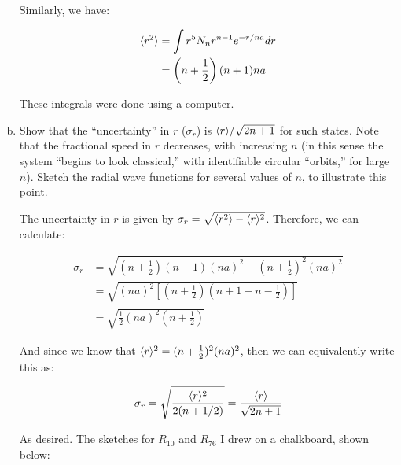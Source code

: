\documentclass[10pt]{article}
\begin{document}
\begin{enumerate}[(a)]
\begin{solution}
            Similarly, we have: 

            \begin{align*}
                \langle r^2 \rangle &= \int r^5 N_n r^{n-1}e^{-r/na} dr \\
                &= \left(n + \frac 12 \right) (n+1) na
            \end{align*}

            These integrals were done using a computer. 
        \end{solution}
        \item Show that the ``uncertainty'' in $r$ ($\sigma_r$) is $\langle r \rangle/\sqrt{2n+1}$ for such states. Note that the fractional speed in $r$ decreases, with increasing $n$ (in this sense the system ``begins to look classical,'' with identifiable circular ``orbits,'' for large $n$). Sketch the radial wave functions for several values of $n$, to illustrate this point. 
        
        \begin{solution}
            The uncertainty in $r$ is given by $\sigma_r = \sqrt{\langle r^2 \rangle - \langle r \rangle^2}$. Therefore, we can calculate: 

            \begin{align*}
                \sigma_r &= \sqrt{\left( n + \frac 12 \right) (n+1)(na)^2 - \left( n + \frac 12\right)^2 (na)^2}\\
                &= \sqrt{(na)^2\left[ \left(n + \frac 12\right) \left( n + 1 - n - \frac 12 \right)\right]}\\
                &= \sqrt{\frac 12 (na)^2 \left( n + \frac 12\right) }
            \end{align*}

            And since we know that $\langle r \rangle^2 = (n + \frac 12)^2(na)^2$, then we can equivalently write this as: 

            \[ \sigma_r = \sqrt{\frac{\langle r \rangle^2}{2(n + 1/2)}} = \frac{\langle r \rangle}{\sqrt{2n + 1}}\]
            
            As desired. The sketches for $R_{10}$ and $R_{76}$ I drew on a chalkboard, shown below: 


\end{solution}
\end{enumerate}
\end{document}
